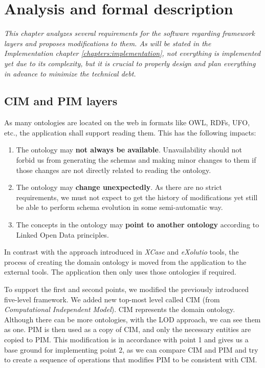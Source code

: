 \chapter{Analysis and formal description}
\label{chapters:analysis}

\textit{This chapter analyzes several requirements for the software regarding framework layers and proposes modifications to them. As will be stated in the Implementation chapter \ref{chapters:implementation}, not everything is implemented yet due to its complexity, but it is crucial to properly design and plan everything in advance to minimize the technical debt.}

\section{CIM and PIM layers}

\begin{requirement}
    \label{requirement:ontologies-on-the-web}
    As many ontologies are located on the web in formats like OWL, RDFs, UFO, etc., the application shall support reading them. This has the following impacts:
    \begin{enumerate}
        \item The ontology may \textbf{not always be available}. Unavailability should not forbid us from generating the schemas and making minor changes to them if those changes are not directly related to reading the ontology.
        \item The ontology may \textbf{change unexpectedly}. As there are no strict requirements, we must not expect to get the history of modifications yet still be able to perform schema evolution in some semi-automatic way.
        \item The concepts in the ontology may \textbf{point to another ontology} according to Linked Open Data principles.
    \end{enumerate}
\end{requirement}

In contrast with the approach introduced in \textit{XCase} and \textit{eXolutio} tools, the process of creating the domain ontology is moved from the application to the external tools. The application then only uses those ontologies if required.

To support the first and second points, we modified the previously introduced five-level framework. We added new top-most level called CIM (from \textit{Computational Independent Model}). CIM represents the domain ontology. Although there can be more ontologies, with the LOD approach, we can see them as one. PIM is then used as a copy of CIM, and only the necessary entities are copied to PIM. This modification is in accordance with point 1 and gives us a base ground for implementing point 2, as we can compare CIM and PIM and try to create a sequence of operations that modifies PIM to be consistent with CIM.

